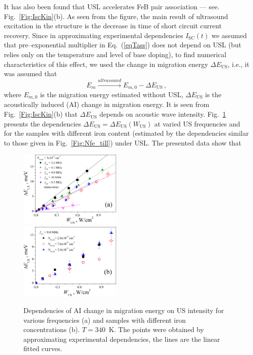 \documentclass[%
 aip,jap,
 amsmath,amssymb,
 reprint,%
]{revtex4-1}
\begin{document}
It has also been found that USL accelerates FeB pair association --–
see. Fig.~\ref{Fig:IscKin}(b).
As seen from the figure, the main result of ultrasound excitation in the structure
is the decrease in time of short circuit current recovery.
Since in approximating experimental dependencies $I_\mathrm{SC}(t)$ we assumed that pre--exponential multiplier in Eq.~(\ref{eqTass}) does not depend on USL
(but relies only on the temperature and level of base doping),
to find numerical characteristics of this effect,
we used the change in migration energy $\Delta E_\mathrm{US}$, i.e., it was assumed that
\begin{equation}
\label{eqEmUs}
E_m \xrightarrow{ultrasound} E_{m,0}-\Delta E_\mathrm{US}\,,
\end{equation}
where $E_{m,0}$ is the migration energy estimated without USL,
$\Delta E_\mathrm{US}$ is the acoustically induced (AI) change in migration energy.
It is seen from Fig.~\ref{Fig:IscKin}(b)
that $\Delta E_\mathrm{US}$ depends on acoustic wave intensity.
Fig.~\ref{Fig:EmWus} presents the dependencies $\Delta E_\mathrm{US}=\Delta E_\mathrm{US}(W_\mathrm{US})$ at varied US frequencies and for the samples with different iron content
(estimated by the dependencies similar to those given in Fig.~\ref{Fig:Nfe_till}) under USL.
The presented data show that

\begin{figure}
\includegraphics[width=0.45\textwidth]{Fig5a}\\%
\includegraphics[width=0.45\textwidth]{Fig5b}%
\caption{\label{Fig:EmWus}
Dependencies of AI change in migration energy on US intensity for various
frequencies (a) and samples with different  iron concentrations (b).
$T=340$~K.
The points were obtained by approximating experimental dependencies,
the lines are the linear fitted curves.
}
\end{figure}
\end{document}
